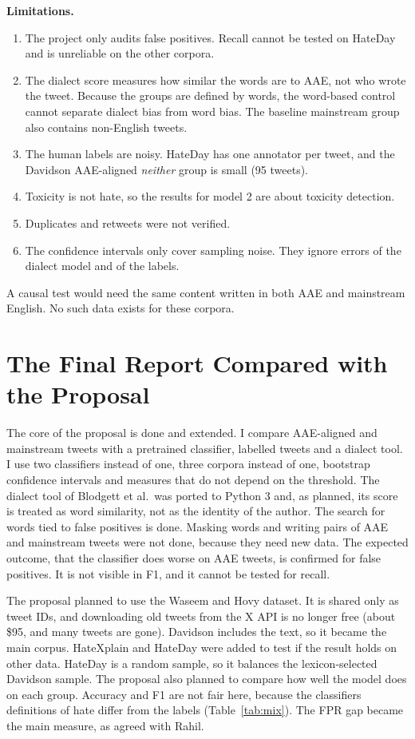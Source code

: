 \documentclass[runningheads,a4paper,oribibl]{llncs}
\begin{document}
\textbf{Limitations.}
\begin{enumerate}
  \item The project only audits false positives. Recall cannot be tested on HateDay and is unreliable on the other corpora.
  \item The dialect score measures how similar the words are to AAE, not who wrote the
  tweet. Because the groups are defined by words, the word-based control cannot separate
  dialect bias from word bias. The baseline mainstream group also contains non-English tweets.
  \item The human labels are noisy. HateDay has one annotator per tweet, and the Davidson
  AAE-aligned \emph{neither} group is small (95 tweets).
  \item Toxicity is not hate, so the results for model 2 are about toxicity detection.
  \item Duplicates and retweets were not verified.
  \item The confidence intervals only cover sampling noise. They ignore errors of the dialect
  model and of the labels.
\end{enumerate}
A causal test would need the same content written in both AAE and mainstream English. No
such data exists for these corpora.

\section{The Final Report Compared with the Proposal}\label{sec:proposal}

The core of the proposal is done and extended. I compare AAE-aligned
and mainstream tweets with a pretrained classifier, labelled tweets and a dialect tool. I use
two classifiers instead of one, three corpora instead of one, bootstrap confidence intervals
and measures that do not depend on the threshold. The dialect tool of Blodgett et al.\ was
ported to Python 3 and, as planned, its score is treated as word similarity, not as the
identity of the author. The search for words tied to false positives is done.
Masking words and writing pairs of AAE and mainstream tweets were not done, because they need
new data. The expected outcome, that the classifier does worse on AAE tweets, is confirmed for
false positives. It is not visible in F1, and it cannot be tested for recall.

The proposal planned to use the Waseem and Hovy dataset. It is shared
only as tweet IDs, and downloading old tweets from the X API is no longer free (about \$95,
and many tweets are gone). Davidson includes the text, so it became the main corpus.
HateXplain and HateDay were added to test if the result holds on other data. HateDay is a
random sample, so it balances the lexicon-selected Davidson sample. The proposal also planned
to compare how well the model does on each group. Accuracy and F1 are not fair here, because
the classifiers definitions of hate differ from the labels (Table~\ref{tab:mix}). The FPR gap
became the main measure, as agreed with Rahil.
\end{document}
